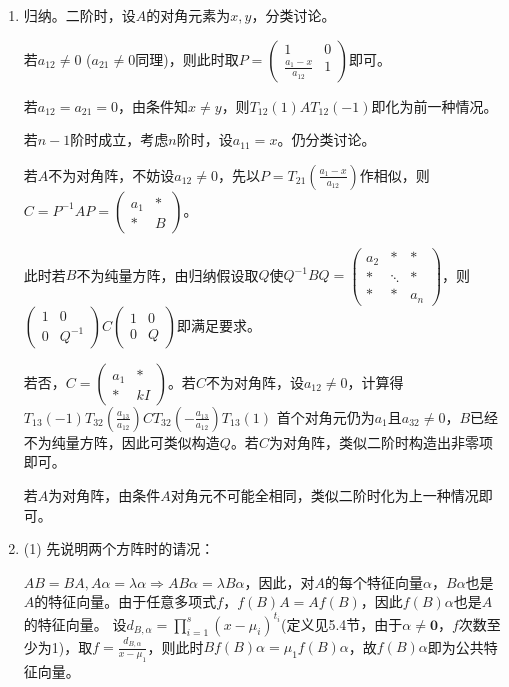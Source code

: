 \documentclass[a4paper,UTF8,fontset=windows]{ctexart}
\begin{document}
\begin{enumerate}
\item
归纳。二阶时，设$A$的对角元素为$x,y$，分类讨论。

若$a_{12}\ne0$ ($a_{21}\ne0$同理)，则此时取$P=\begin{pmatrix}1&0\\\frac{a_1-x}{a_{12}}&1\end{pmatrix}$即可。

若$a_{12}=a_{21}=0$，由条件知$x\ne y$，则$T_{12}(1)AT_{12}(-1)$即化为前一种情况。

若$n-1$阶时成立，考虑$n$阶时，设$a_{11}=x$。仍分类讨论。

若$A$不为对角阵，不妨设$a_{12}\ne0$，先以$P=T_{21}\left(\frac{a_1-x}{a_{12}}\right)$作相似，则$C=P^{-1}AP=\begin{pmatrix}a_1&\ast\\\ast&B\end{pmatrix}$。

此时若$B$不为纯量方阵，由归纳假设取$Q$使$Q^{-1}BQ=\begin{pmatrix}a_2&\ast&\ast\\\ast&\ddots&\ast\\\ast&\ast&a_n\end{pmatrix}$，则$\begin{pmatrix}1&0\\0&Q^{-1}\end{pmatrix}C\begin{pmatrix}1&0\\0&Q\end{pmatrix}$即满足要求。

若否，$C=\begin{pmatrix}a_1&\ast\\\ast&kI\end{pmatrix}$。若$C$不为对角阵，设$a_{12}\ne0$，计算得$T_{13}(-1)T_{32}\left(\frac{a_{13}}{a_{12}}\right)CT_{32}\left(-\frac{a_{13}}{a_{12}}\right)T_{13}(1)$ 首个对角元仍为$a_1$且$a_{32}\ne0$，$B$已经不为纯量方阵，因此可类似构造$Q$。若$C$为对角阵，类似二阶时构造出非零项即可。

若$A$为对角阵，由条件$A$对角元不可能全相同，类似二阶时化为上一种情况即可。

\item
(1) 先说明两个方阵时的请况：

$AB=BA,A\alpha=\lambda\alpha\Rightarrow AB\alpha=\lambda B\alpha$，因此，对$A$的每个特征向量$\alpha$，$B\alpha$也是$A$的特征向量。由于任意多项式$f$，$f(B)A=Af(B)$，因此$f(B)\alpha$也是$A$的特征向量。
设$d_{B,\alpha}=\prod_{i=1}^{s}(x-\mu_i)^{t_i}$(定义见5.4节，由于$\alpha\ne\mathbf{0}$，$f$次数至少为1)，取$f=\frac{d_{B,\alpha}}{x-\mu_1}$，则此时$Bf(B)\alpha=\mu_1f(B)\alpha$，故$f(B)\alpha$即为公共特征向量。


\end{enumerate}
\end{document}
